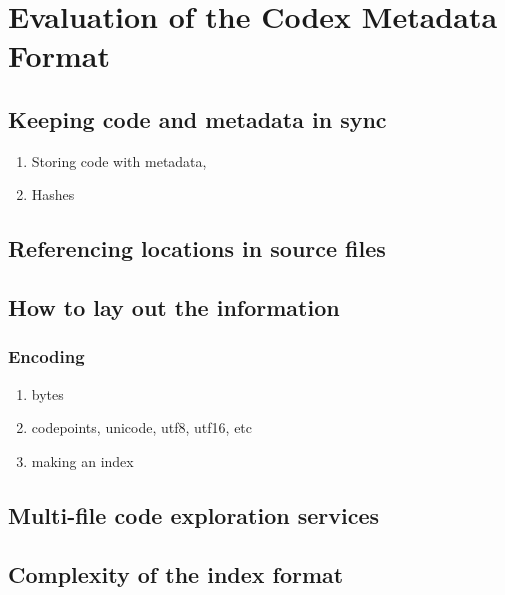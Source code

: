 
\chapter{Evaluation of the Codex Metadata Format}\label{chap:evaluation}



\section{Keeping code and metadata in sync}
\begin{enumerate}
    \item Storing code with metadata,
    \item Hashes
\end{enumerate}

\section{Referencing locations in source files}

\section{How to lay out the information}

\subsection{Encoding}
\begin{enumerate}
    \item bytes
    \item codepoints, unicode, utf8, utf16, etc
    \item making an index
\end{enumerate}

\section{Multi-file code exploration services}

\section{Complexity of the index format}
